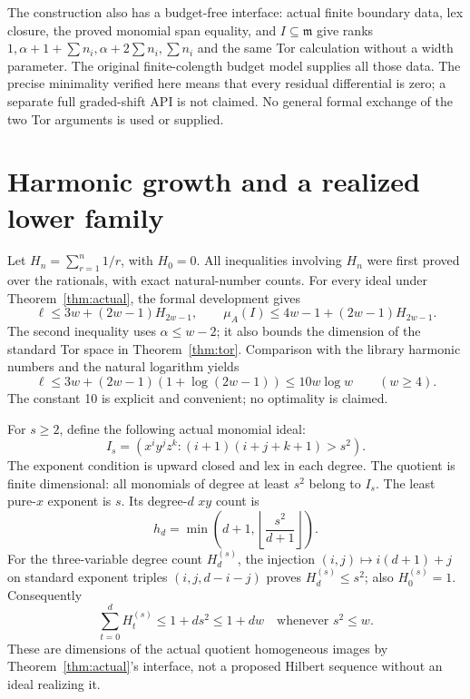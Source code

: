 \documentclass[11pt,a4paper]{article}
\begin{document}
The construction also has a budget-free interface: actual finite boundary
data, lex closure, the proved monomial span equality, and $I\subseteq\mathfrak m$
give ranks $1,\alpha+1+\sum n_i,\alpha+2\sum n_i,\sum n_i$ and the same Tor
calculation without a width parameter. The original finite-colength budget
model supplies all those data. The precise minimality verified here means
that every residual differential is zero; a separate full graded-shift API
is not claimed. No general formal exchange of the two Tor arguments is
used or supplied.

\section{Harmonic growth and a realized lower family}\label{sec:log}
Let $H_n=\sum_{r=1}^{n}1/r$, with $H_0=0$. All inequalities involving
$H_n$ were first proved over the rationals, with exact natural-number counts.
For every ideal under Theorem~\ref{thm:actual}, the formal development gives
\begin{equation}\label{eq:harmonic}
 \ell\le3w+(2w-1)H_{2w-1},\qquad
 \mu_A(I)\le4w-1+(2w-1)H_{2w-1}.
\end{equation}
The second inequality uses $\alpha\le w-2$; it also bounds the dimension of the
standard Tor space in Theorem~\ref{thm:tor}. Comparison with the library harmonic
numbers and the natural logarithm yields
\begin{equation}\label{eq:logupper}
 \ell\le 3w+(2w-1)(1+\log(2w-1))\le10w\log w
 \qquad(w\ge4).
\end{equation}
The constant 10 is explicit and convenient; no optimality is claimed.

For $s\ge2$, define the following actual monomial ideal:
\[
 I_s=(x^iy^jz^k:(i+1)(i+j+k+1)>s^2).
\]
The exponent condition is upward closed and lex in each degree. The quotient
is finite dimensional: all monomials of degree at least $s^2$ belong to $I_s$.
The least pure-$x$ exponent is $s$. Its degree-$d$ $xy$ count is
\[
 h_d=\min\left(d+1,\left\lfloor\frac{s^2}{d+1}\right\rfloor\right).
\]
For the three-variable degree count $H^{(s)}_d$, the injection
$(i,j)\mapsto i(d+1)+j$ on standard exponent triples $(i,j,d-i-j)$
proves $H^{(s)}_d\le s^2$; also $H^{(s)}_0=1$. Consequently
\[
 \sum_{t=0}^{d}H^{(s)}_t\le1+ds^2\le1+dw
 \quad\text{whenever }s^2\le w.
\]
These are dimensions of the actual quotient homogeneous images by
Theorem~\ref{thm:actual}'s interface, not a proposed Hilbert sequence without
an ideal realizing it.
\end{document}
